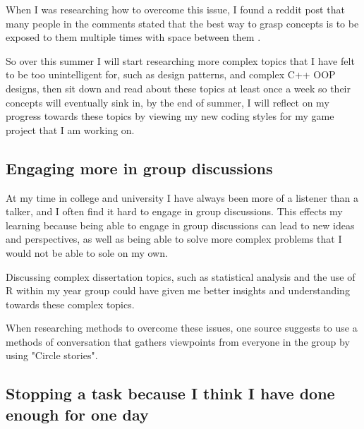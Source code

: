 \documentclass{scrartcl}
\begin{document}
When I was researching how to overcome this issue, I found a reddit post that many people in the comments stated that the best way to grasp concepts is to be exposed to them multiple times with space between them \cite{Reddit}.

So over this summer I will start researching more complex topics that I have felt to be too unintelligent for, such as design patterns, and complex C++ OOP designs, then sit down and read about these topics at least once a week so their concepts will eventually sink in, by the end of summer, I will reflect on my progress towards these topics by viewing my new coding styles for my game project that I am working on.



\subsection{Engaging more  in group discussions}

At my time in college and university I have always been more of a listener than a talker, and I often find it hard to engage in group discussions. This effects my learning because being able to engage in group discussions can lead to new ideas and perspectives, as well as being able to solve more complex problems that I would not be able to sole on my own.

Discussing complex dissertation topics, such as statistical analysis and the use of R within my year group could have given me better insights and understanding towards these complex topics.
\par




When researching methods to overcome these issues, one source \cite{Group} suggests to use a methods of conversation that gathers viewpoints from everyone in the group by using "Circle stories".






\subsection{Stopping a task because I think I have done enough for one day}
\end{document}
